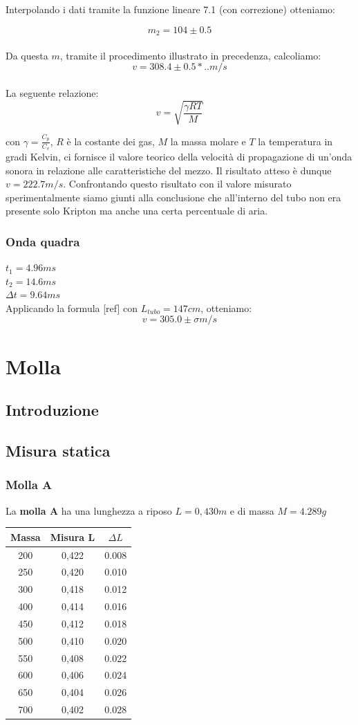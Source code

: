 \documentclass[a4paper,10pt]{report}
\begin{document}
Interpolando i dati tramite la funzione lineare 7.1 (con correzione) otteniamo:

$$ m_2 = 104 \pm 0.5 $$ 
\\
Da questa $m$, tramite il procedimento illustrato in precedenza, calcoliamo: 
$$v = 308.4\pm0.5*..  m/s $$
\\
La seguente relazione:
$$v=\sqrt{\frac{\gamma RT}{M}}$$

con $\gamma = \frac{C_p}{C_v}$, $R$ è la costante dei gas, $M$ la massa molare e $T$ la temperatura in gradi Kelvin, ci fornisce il valore teorico della velocità di propagazione di un'onda sonora in relazione alle caratteristiche del mezzo. 
Il risultato atteso è dunque $v=222.7 m/s$. Confrontando questo risultato con il valore misurato sperimentalmente siamo giunti alla conclusione che all'interno del tubo non era presente solo Kripton ma anche una certa percentuale di aria.

\subsection{Onda quadra}
$t_1 = 4.96 ms $\\
$t_2 = 14.6 ms $\\
$\Delta t = 9.64 ms $ \\
Applicando la formula [ref] con $L_{tubo} = 147 cm$, otteniamo:
$$ v = 305.0 \pm \sigma m/s $$ 



\chapter{Molla}
\section{Introduzione}
\section{Misura statica}
\subsection*{Molla A}
La \textbf{molla A} ha una lunghezza a riposo $L=0,430 m$ e di massa $M=4.289g$\\
\begin{tabular}{c|c|c}
Massa & Misura L & $\Delta L$ \\
\midrule
200 & 0,422 & 0.008\\
250 & 0,420 & 0.010\\
300 & 0,418 & 0.012\\
400 & 0,414 & 0.016\\
450 & 0,412 & 0.018\\
500 & 0,410 & 0.020\\
550 & 0,408 & 0.022\\
600 & 0,406 & 0.024\\
650 & 0,404 & 0.026\\
700 & 0,402 & 0.028\\
\end{tabular}
\end{document}

